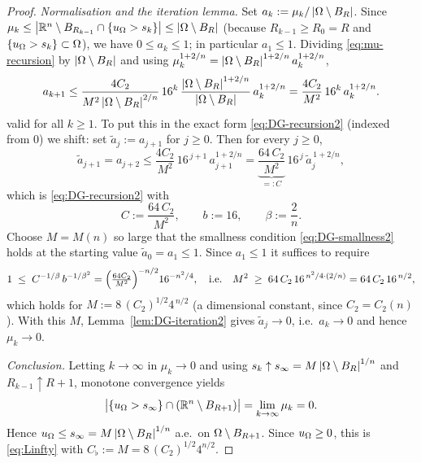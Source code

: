 \begin{proof}
\smallskip
\emph{Normalisation and the iteration lemma.} Set
$a_k:=\mu_k/\left|\Omega\setminus B_R\right|$. Since
$\mu_k\le\left|\mathbb R^n\setminus B_{R_{k-1}}\cap\{u_\Omega>s_k\}\right|
\le\left|\Omega\setminus B_R\right|$ (because $R_{k-1}\ge R_0=R$ and
$\{u_\Omega>s_k\}\subset\Omega$), we have $0\le a_k\le1$; in particular
$a_1\le1$. Dividing \eqref{eq:mu-recursion} by
$\left|\Omega\setminus B_R\right|$ and using
$\mu_k^{1+2/n}=\left|\Omega\setminus B_R\right|^{1+2/n}a_k^{1+2/n}$,
\[
   a_{k+1}
   \le\frac{4C_2}{M^2\left|\Omega\setminus B_R\right|^{2/n}}\,16^k\,
   \frac{\left|\Omega\setminus B_R\right|^{1+2/n}}{\left|\Omega\setminus B_R\right|}
   \,a_k^{1+2/n}
   =\frac{4C_2}{M^2}\,16^{k}\,a_k^{1+2/n}.
\]
valid for all $k\ge1$. To put this in the exact form
\eqref{eq:DG-recursion2} (indexed from $0$) we shift: set
$\widetilde a_j:=a_{j+1}$ for $j\ge0$. Then for every $j\ge0$,
\[
   \widetilde a_{j+1}=a_{j+2}
   \le\frac{4C_2}{M^2}\,16^{\,j+1}\,a_{j+1}^{1+2/n}
   =\underbrace{\frac{64\,C_2}{M^2}}_{=:C}\,16^{\,j}\,
     \widetilde a_j^{\,1+2/n},
\]
which is \eqref{eq:DG-recursion2} with
\[
   C:=\frac{64\,C_2}{M^2},\qquad b:=16,\qquad\beta:=\frac2n .
\]
Choose $M=M(n)$ so large that the smallness condition
\eqref{eq:DG-smallness2} holds at the starting value
$\widetilde a_0=a_1\le1$. Since $a_1\le1$ it suffices to require
\[
   1\;\le\;C^{-1/\beta}\,b^{-1/\beta^2}
   =\Bigl(\tfrac{64C_2}{M^2}\Bigr)^{-n/2}16^{-n^2/4},
   \quad\text{i.e.}\quad
   M^2\;\ge\;64\,C_2\,16^{\,n^2/4\cdot(2/n)}=64\,C_2\,16^{\,n/2},
\]
which holds for $M:=8\,(C_2)^{1/2}4^{\,n/2}$ (a dimensional constant,
since $C_2=C_2(n)$). With this $M$, Lemma~\ref{lem:DG-iteration2} gives
$\widetilde a_j\to0$, i.e.\ $a_k\to0$ and hence $\mu_k\to0$.

\smallskip
\emph{Conclusion.} Letting $k\to\infty$ in $\mu_k\to0$ and using
$s_k\uparrow s_\infty=M\left|\Omega\setminus B_R\right|^{1/n}$ and
$R_{k-1}\uparrow R+1$, monotone convergence yields
\[
   \bigl|\{u_\Omega>s_\infty\}\cap(\mathbb R^n\setminus B_{R+1})\bigr|
   =\lim_{k\to\infty}\mu_k=0 .
\]
Hence $u_\Omega\le s_\infty=M\left|\Omega\setminus B_R\right|^{1/n}$ a.e.\ on
$\Omega\setminus B_{R+1}$. Since $u_\Omega\ge0$, this is
\eqref{eq:Linfty} with $C_\flat:=M=8\,(C_2)^{1/2}4^{n/2}$.
\end{proof}

